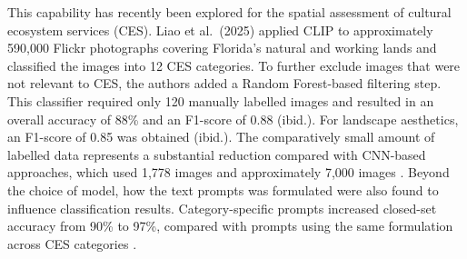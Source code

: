 \documentclass[11pt]{article}
\renewcommand{\_}{\textunderscore\allowbreak{}}
\begin{document}
This capability has recently been explored for the spatial assessment of cultural ecosystem services (CES). Liao et al.~(2025) applied CLIP to approximately 590,000 Flickr photographs covering Florida's natural and working lands and classified the images into 12 CES categories. To further exclude images that were not relevant to CES, the authors added a Random Forest-based filtering step. This classifier required only 120 manually labelled images and resulted in an overall accuracy of 88\% and an F1-score of 0.88 (ibid.). For landscape aesthetics, an F1-score of 0.85 was obtained (ibid.). The comparatively small amount of labelled data represents a substantial reduction compared with CNN-based approaches, which used 1,778 images \citep{cardoso_classifying_2022} and approximately 7,000 images \citep{lingua_valuing_2022}. Beyond the choice of model, how the text prompts was formulated were also found to influence classification results. Category-specific prompts increased closed-set accuracy from 90\% to 97\%, compared with prompts using the same formulation across CES categories \citep{liao_mapping_2025}.
\end{document}
